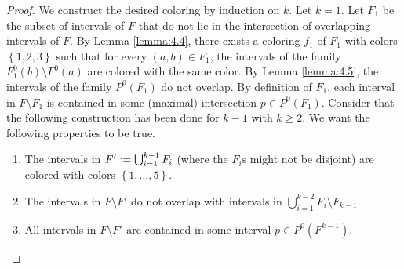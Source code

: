 \documentclass[12pt]{article}
\theoremstyle{definition}
\newcommand{\defeq}{\vcentcolon=}
\begin{document}
    \begin{proof}
        We construct the desired
        coloring by induction
        on $k$. 
        Let $k = 1$.
        Let $F_1$ be the subset
        of intervals of $F$ that 
        do not lie in the intersection
        of overlapping intervals of $F$.
        By Lemma \ref{lemma:4.4},
        there exists a coloring
        $f_1$ of $F_1$ with colors
        $\left\{1,2,3\right\}$ such
        that for every $\left(a,b\right)
        \in F_1$, the intervals
        of the family $F^{0}_{1}
        \left(b\right) \setminus F^{0}\left(a\right)$
        are colored with the same
        color.
        By Lemma \ref{lemma:4.5},
        the intervals of the family
        $P^{0}\left(F_1\right)$ 
        do not overlap. By definition
        of $F_1$, each interval in 
        $F \setminus F_1$ is contained
        in some (maximal) intersection
        $p \in P^{0}\left(F_1\right)$.
        Consider that the following
        construction has been done
        for $k - 1$ with $k \geq 2$.
        We want the following properties
        to be true.
        \begin{enumerate}
            \item The intervals in
                $F' \defeq 
                \bigcup_{i=1}^{k-1} F_{i}$
                (where the $F_{i}$s
                might not be disjoint)
                are colored with colors
                $\left\{1, \ldots, 5\right\}$.
            \item The intervals in
                $F \setminus F'$ do not
                overlap with intervals
                in $\bigcup_{i=1}^{k-2}
                F_{i} \setminus F_{k-1}$.
                \label{cond:2}
            \item \label{cond:3} All intervals in 
                $F \setminus F'$ 
                are contained in some 
                interval $p \in 
                P^{0}\left(F^{k-1}\right)$.

\end{enumerate}
\end{proof}
\end{document}
